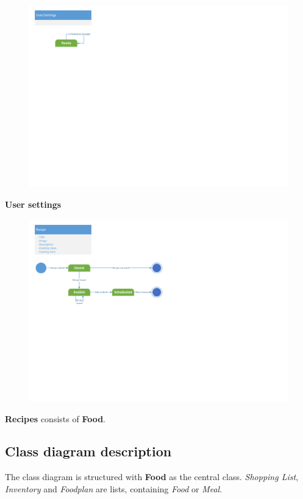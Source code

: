 \begin{figure}[H]
	\centering
	\includegraphics[width=1.0\textwidth]{Development/ProblemDomain/UserSettingsClass.pdf}
	\label{UserSettingsClass}
\end{figure}
\textbf{User settings}

\begin{figure}[H]
	\centering
	\includegraphics[width=1.0\textwidth]{Development/ProblemDomain/RecipeClass.pdf}
	\label{RecipeClass}
	\end{figure}
\textbf{Recipes} consists of \textbf{Food}.

\subsection{Class diagram description}
The class diagram is structured with \textbf{Food} as the central class. 
\textit{Shopping List}, \textit{Inventory} and \textit{Foodplan} are lists, containing \textit{Food} or \textit{Meal}.

